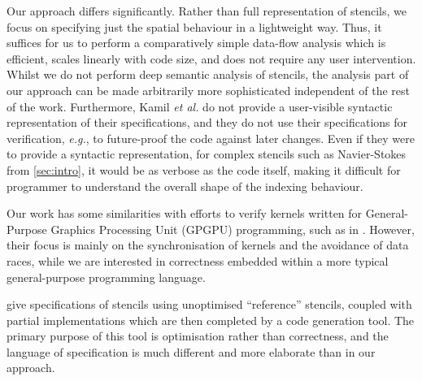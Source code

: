 \documentclass[10pt,preprint,numbers]{sigplanconf}
\theoremstyle{definition}
\newcommand{\eg}{\emph{e.g.}}
\begin{document}
Our approach differs significantly. Rather than 
full representation of stencils, we focus on specifying
just the spatial behaviour in a lightweight way.
Thus, it suffices for us to perform a comparatively
simple data-flow analysis which is efficient, scales linearly with
code size, and does not require any user intervention.
Whilst we do not perform deep semantic analysis of stencils,
 the analysis part of our
approach can be made arbitrarily more sophisticated independent of the rest of
the work.
%
Furthermore, Kamil \emph{et al.} do not provide a user-visible
syntactic representation of their specifications, and they do
not use their specifications for verification, \eg{}, to future-proof
the code against later changes. Even if they were to provide a
syntactic representation, for complex stencils such as Navier-Stokes
from \cref{sec:intro}, it would be as verbose as the code itself,
making it difficult for programmer to understand the overall shape of
the indexing behaviour.

Our work has some similarities with efforts to verify kernels
written for General-Purpose Graphics Processing Unit (GPGPU)
programming, such as in \citet{Blom:2014:SoCP}. %
However, their focus is
mainly on the synchronisation of kernels and the avoidance of
data races, while we are interested in correctness 
embedded within a more typical general-purpose programming
language. %

\citet{Solar-Lezama:2007:PLDI} give specifications of stencils using
unoptimised ``reference'' stencils, coupled with partial
implementations which are then completed by a code
generation tool. %
The primary purpose of this tool is optimisation rather than
correctness, and the language of specification is much different and
more elaborate than in our approach.
\end{document}
